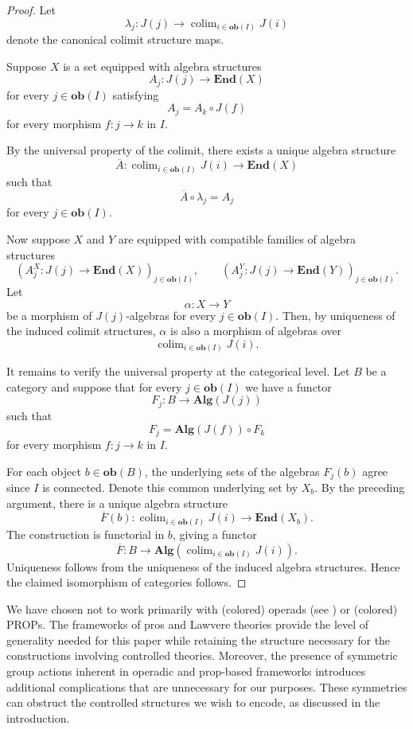 \documentclass{tac}
\begin{document}
\begin{proof}
Let
\[
\lambda_j:J(j)\to\operatorname{colim}_{i\in\mathbf{ob}(I)}J(i)
\]
denote the canonical colimit structure maps.

Suppose $X$ is a set equipped with algebra structures
\[
A_j:J(j)\to\mathbf{End}(X)
\]
for every $j\in\mathbf{ob}(I)$ satisfying
\[
A_j=A_k\circ J(f)
\]
for every morphism $f:j\to k$ in $I$.

By the universal property of the colimit, there exists a unique algebra structure
\[
\overline{A}:
\operatorname{colim}_{i\in\mathbf{ob}(I)}J(i)
\to\mathbf{End}(X)
\]
such that
\[
\overline{A}\circ\lambda_j=A_j
\]
for every $j\in\mathbf{ob}(I)$.

Now suppose $X$ and $Y$ are equipped with compatible families of algebra structures
\[
(A^X_j:J(j)\to\mathbf{End}(X))_{j\in\mathbf{ob}(I)},
\qquad
(A^Y_j:J(j)\to\mathbf{End}(Y))_{j\in\mathbf{ob}(I)}.
\]
Let
\[
\alpha:X\to Y
\]
be a morphism of $J(j)$-algebras for every $j\in\mathbf{ob}(I)$. Then, by uniqueness of the induced colimit structures, $\alpha$ is also a morphism of algebras over
\[
\operatorname{colim}_{i\in\mathbf{ob}(I)}J(i).
\]

It remains to verify the universal property at the categorical level. Let $B$ be a category and suppose that for every $j\in\mathbf{ob}(I)$ we have a functor
\[
F_j:B\to\mathbf{Alg}(J(j))
\]
such that
\[
F_j=\mathbf{Alg}(J(f))\circ F_k
\]
for every morphism $f:j\to k$ in $I$.

For each object $b\in\mathbf{ob}(B)$, the underlying sets of the algebras $F_j(b)$ agree since $I$ is connected. Denote this common underlying set by $X_b$. By the preceding argument, there is a unique algebra structure
\[
\overline{F}(b):
\operatorname{colim}_{i\in\mathbf{ob}(I)}J(i)
\to\mathbf{End}(X_b).
\]
The construction is functorial in $b$, giving a functor
\[
\overline{F}:B\to
\mathbf{Alg}
\left(
\operatorname{colim}_{i\in\mathbf{ob}(I)}J(i)
\right).
\]
Uniqueness follows from the uniqueness of the induced algebra structures. Hence the claimed isomorphism of categories follows.
\end{proof}

We have chosen not to work primarily with (colored) operads (see \cite{Yau2016}) or (colored) PROPs. The frameworks of pros and Lawvere theories provide the level of generality needed for this paper while retaining the structure necessary for the constructions involving controlled theories. Moreover, the presence of symmetric group actions inherent in operadic and prop-based frameworks introduces additional complications that are unnecessary for our purposes. These symmetries can obstruct the controlled structures we wish to encode, as discussed in the introduction.
\end{document}
